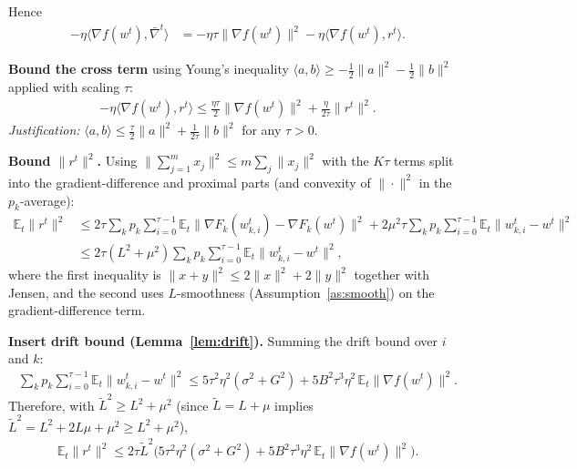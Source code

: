 \documentclass{article}
\begin{document}
Hence
\begin{align}
-\eta \langle \nabla f(w^t), \bar\nabla^t\rangle
&= -\eta\tau \|\nabla f(w^t)\|^2 - \eta\langle \nabla f(w^t), r^t\rangle.
\tag{Step 6}
\end{align}

\textbf{Bound the cross term} using Young's inequality $\langle a,b\rangle \ge -\tfrac{1}{2}\|a\|^2 - \tfrac12\|b\|^2$ applied with scaling $\tau$:
\begin{align}
-\eta\langle \nabla f(w^t), r^t\rangle
\le \frac{\eta\tau}{2}\|\nabla f(w^t)\|^2 + \frac{\eta}{2\tau}\|r^t\|^2 .
\tag{Step 7}
\end{align}
\emph{Justification:} $\langle a,b\rangle \le \tfrac{\tau}{2}\|a\|^2 + \tfrac{1}{2\tau}\|b\|^2$ for any $\tau>0$.

\textbf{Bound $\|r^t\|^2$.} Using $\|\sum_{j=1}^m x_j\|^2 \le m\sum_j\|x_j\|^2$ with the $K\tau$ terms split into the gradient-difference and proximal parts (and convexity of $\|\cdot\|^2$ in the $p_k$-average):
\begin{align}
\mathbb{E}_t\|r^t\|^2
&\le 2\tau \sum_{k}p_k\sum_{i=0}^{\tau-1}\mathbb{E}_t\|\nabla F_k(w_{k,i}^t)-\nabla F_k(w^t)\|^2
 + 2\mu^2 \tau \sum_k p_k \sum_{i=0}^{\tau-1}\mathbb{E}_t\|w_{k,i}^t - w^t\|^2 \nonumber\\
&\le 2\tau (L^2 + \mu^2) \sum_{k}p_k\sum_{i=0}^{\tau-1}\mathbb{E}_t\|w_{k,i}^t - w^t\|^2 ,
\tag{Step 8}
\end{align}
where the first inequality is $\|x+y\|^2\le 2\|x\|^2+2\|y\|^2$ together with Jensen, and the second uses $L$-smoothness (Assumption~\ref{as:smooth}) on the gradient-difference term.

\textbf{Insert drift bound (Lemma~\ref{lem:drift}).} Summing the drift bound over $i$ and $k$:
\begin{align}
\sum_k p_k\sum_{i=0}^{\tau-1}\mathbb{E}_t\|w_{k,i}^t-w^t\|^2
\le 5\tau^2\eta^2(\sigma^2+G^2) + 5B^2\tau^3\eta^2 \,\mathbb{E}_t\|\nabla f(w^t)\|^2 .
\tag{Step 9}
\end{align}
Therefore, with $\tilde L^2 \ge L^2 + \mu^2$ (since $\tilde L = L+\mu$ implies $\tilde L^2 = L^2+2L\mu+\mu^2 \ge L^2+\mu^2$),
\begin{align}
\mathbb{E}_t\|r^t\|^2
\le 2\tau \tilde L^2\Big(5\tau^2\eta^2(\sigma^2+G^2) + 5B^2\tau^3\eta^2\,\mathbb{E}_t\|\nabla f(w^t)\|^2\Big).
\tag{Step 10}
\end{align}
\end{document}
